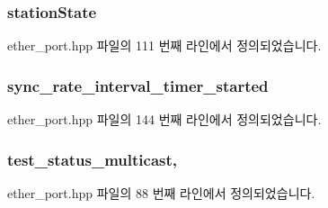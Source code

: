 \subsubsection[{\texorpdfstring{station\+State}{stationState}}]{ station\+State\hspace{0.3cm}{\ttfamily [private]}}\hypertarget{class_ether_port_a91c1bea6a5b70f19ba852e5feb706324}{}\label{class_ether_port_a91c1bea6a5b70f19ba852e5feb706324}


ether\+\_\+port.\+hpp 파일의 111 번째 라인에서 정의되었습니다.

\subsubsection[{\texorpdfstring{sync\+\_\+rate\+\_\+interval\+\_\+timer\+\_\+started}{sync_rate_interval_timer_started}}]{ sync\+\_\+rate\+\_\+interval\+\_\+timer\+\_\+started\hspace{0.3cm}{\ttfamily [private]}}\hypertarget{class_ether_port_a6379434fb3c5bf494ec370d4ca1c448f}{}\label{class_ether_port_a6379434fb3c5bf494ec370d4ca1c448f}


ether\+\_\+port.\+hpp 파일의 144 번째 라인에서 정의되었습니다.

\subsubsection[{\texorpdfstring{test\+\_\+status\+\_\+multicast}{test_status_multicast}}]{ test\+\_\+status\+\_\+multicast\hspace{0.3cm}{\ttfamily [static]}, {\ttfamily [private]}}\hypertarget{class_ether_port_a26ef8ffc3c636a78099d6709663d14b9}{}\label{class_ether_port_a26ef8ffc3c636a78099d6709663d14b9}


ether\+\_\+port.\+hpp 파일의 88 번째 라인에서 정의되었습니다.

